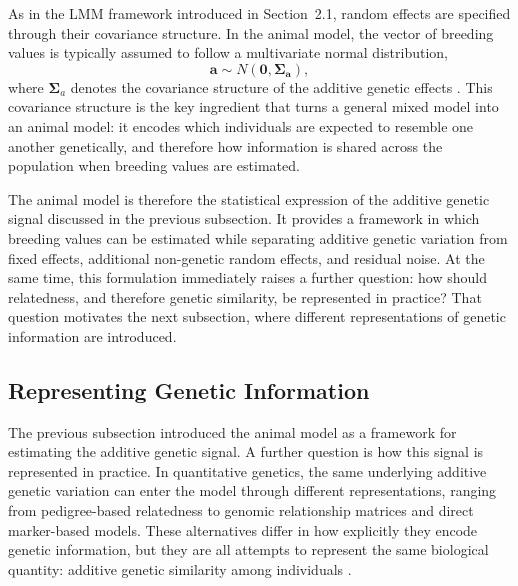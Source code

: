 As in the LMM framework introduced in Section~2.1, random effects are specified through their covariance structure. %
In the animal model, the vector of breeding values is typically assumed to follow a multivariate normal distribution,
\[
\mathbf{a} \sim N(\mathbf{0}, \mathbf{\Sigma_a}),
\]
where $\boldsymbol{\Sigma}_a$ denotes the covariance structure of the additive genetic effects \parencite{wilson_ecologists_2010, lynch_genetics_1998, kruuk_estimating_2004}. %
This covariance structure is the key ingredient that turns a general mixed model into an animal model: it encodes which individuals are expected to resemble one another genetically, and therefore how information is shared across the population when breeding values are estimated. %

The animal model is therefore the statistical expression of the additive genetic signal discussed in the previous subsection. %
It provides a framework in which breeding values can be estimated while separating additive genetic variation from fixed effects, additional non-genetic random effects, and residual noise. %
At the same time, this formulation immediately raises a further question: how should relatedness, and therefore genetic similarity, be represented in practice? %
That question motivates the next subsection, where different representations of genetic information are introduced.


\subsection{Representing Genetic Information}

The previous subsection introduced the animal model as a framework for estimating the additive genetic signal. A further question is how this signal is represented in practice. %
In quantitative genetics, the same underlying additive genetic variation can enter the model through different representations, ranging from pedigree-based relatedness to genomic relationship matrices and direct marker-based models. %
These alternatives differ in how explicitly they encode genetic information, but they are all attempts to represent the same biological quantity: additive genetic similarity among individuals \parencite{wilson_ecologists_2010, kruuk_estimating_2004, ashraf_genomic_2022}. %

